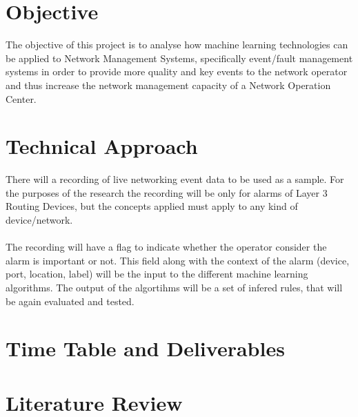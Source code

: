 \documentclass[10pt,a4paper]{article}
\begin{document}
 \section{Objective}
The objective of this project is to analyse how machine learning technologies can be applied to Network Management Systems, specifically event/fault management systems in order to provide more quality and key events to the network operator and thus increase the network management capacity of a Network Operation Center.
 
  \section{Technical Approach}
There will a recording of live networking event data to be used as a sample. For the purposes of the research the recording will be only for alarms of Layer 3 Routing Devices, but the concepts applied must apply to any kind of device/network.
\\\\
The recording will have a flag to indicate whether the operator consider the alarm is important or not. This field along with the context of the alarm (device, port, location, label) will be the input to the different machine learning algorithms. The output of the algortihms will be a set of infered rules, that will be again evaluated and tested.

  \section{Time Table and Deliverables}
  \section{Literature Review}
    
\end{document}
